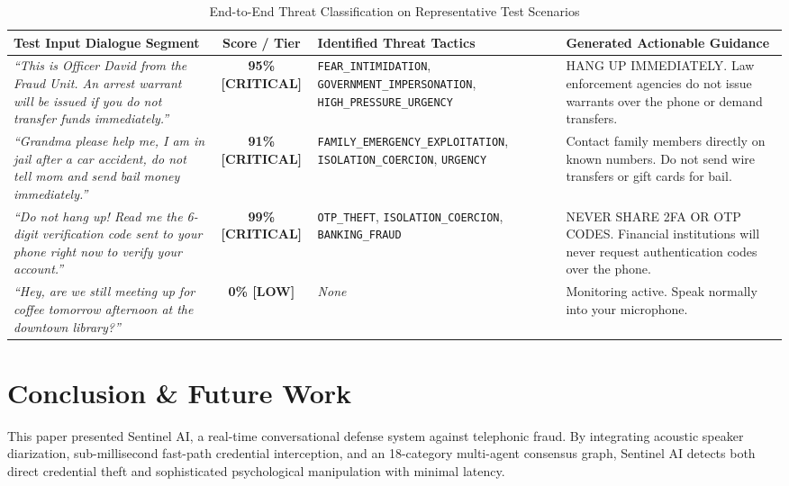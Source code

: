 \documentclass[conference]{IEEEtran}
\begin{document}
\begin{table}[!t]
\caption{End-to-End Threat Classification on Representative Test Scenarios}
\label{tab:scenarios}
\centering
\begin{tabularx}{\textwidth}{p{4.8cm}cp{5.2cm}X}
\toprule
\textbf{Test Input Dialogue Segment} & \textbf{Score / Tier} & \textbf{Identified Threat Tactics} & \textbf{Generated Actionable Guidance} \\
\midrule
\textit{``This is Officer David from the Fraud Unit. An arrest warrant will be issued if you do not transfer funds immediately.''} & \textbf{95\% [CRITICAL]} & \texttt{FEAR\_INTIMIDATION}, \texttt{GOVERNMENT\_IMPERSONATION}, \texttt{HIGH\_PRESSURE\_URGENCY} & HANG UP IMMEDIATELY. Law enforcement agencies do not issue warrants over the phone or demand transfers. \\
\addlinespace
\textit{``Grandma please help me, I am in jail after a car accident, do not tell mom and send bail money immediately.''} & \textbf{91\% [CRITICAL]} & \texttt{FAMILY\_EMERGENCY\_EXPLOITATION}, \texttt{ISOLATION\_COERCION}, \texttt{URGENCY} & Contact family members directly on known numbers. Do not send wire transfers or gift cards for bail. \\
\addlinespace
\textit{``Do not hang up! Read me the 6-digit verification code sent to your phone right now to verify your account.''} & \textbf{99\% [CRITICAL]} & \texttt{OTP\_THEFT}, \texttt{ISOLATION\_COERCION}, \texttt{BANKING\_FRAUD} & NEVER SHARE 2FA OR OTP CODES. Financial institutions will never request authentication codes over the phone. \\
\addlinespace
\textit{``Hey, are we still meeting up for coffee tomorrow afternoon at the downtown library?''} & \textbf{0\% [LOW]} & \textit{None} & Monitoring active. Speak normally into your microphone. \\
\bottomrule
\end{tabularx}
\end{table}

\section{Conclusion \& Future Work}
This paper presented Sentinel AI, a real-time conversational defense system against telephonic fraud. By integrating acoustic speaker diarization, sub-millisecond fast-path credential interception, and an 18-category multi-agent consensus graph, Sentinel AI detects both direct credential theft and sophisticated psychological manipulation with minimal latency.
\end{document}
